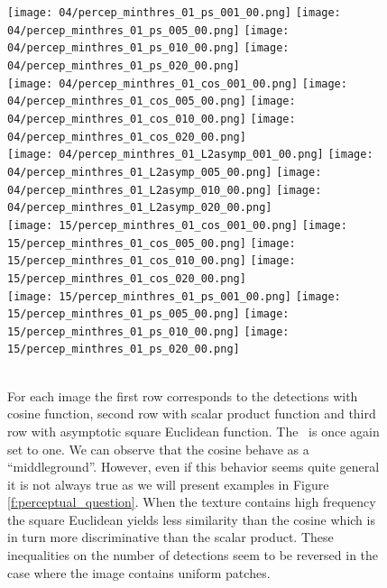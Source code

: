 \begin{figure}[H]
  \centering
  {\texttt{[image: 04/percep\_minthres\_01\_ps\_001\_00.png]}} \hfill
  {\texttt{[image: 04/percep\_minthres\_01\_ps\_005\_00.png]}} \hfill
  {\texttt{[image: 04/percep\_minthres\_01\_ps\_010\_00.png]}} \hfill  
  {\texttt{[image: 04/percep\_minthres\_01\_ps\_020\_00.png]}} \hfill \\
  {\texttt{[image: 04/percep\_minthres\_01\_cos\_001\_00.png]}} \hfill
  {\texttt{[image: 04/percep\_minthres\_01\_cos\_005\_00.png]}} \hfill
  {\texttt{[image: 04/percep\_minthres\_01\_cos\_010\_00.png]}} \hfill  
  {\texttt{[image: 04/percep\_minthres\_01\_cos\_020\_00.png]}} \hfill \\  
  {\texttt{[image: 04/percep\_minthres\_01\_L2asymp\_001\_00.png]}} \hfill
  {\texttt{[image: 04/percep\_minthres\_01\_L2asymp\_005\_00.png]}} \hfill
  {\texttt{[image: 04/percep\_minthres\_01\_L2asymp\_010\_00.png]}} \hfill  
  {\texttt{[image: 04/percep\_minthres\_01\_L2asymp\_020\_00.png]}} \hfill \\
  {\texttt{[image: 15/percep\_minthres\_01\_cos\_001\_00.png]}} \hfill
  {\texttt{[image: 15/percep\_minthres\_01\_cos\_005\_00.png]}} \hfill
  {\texttt{[image: 15/percep\_minthres\_01\_cos\_010\_00.png]}} \hfill  
  {\texttt{[image: 15/percep\_minthres\_01\_cos\_020\_00.png]}} \hfill \\
  {\texttt{[image: 15/percep\_minthres\_01\_ps\_001\_00.png]}} \hfill
  {\texttt{[image: 15/percep\_minthres\_01\_ps\_005\_00.png]}} \hfill
  {\texttt{[image: 15/percep\_minthres\_01\_ps\_010\_00.png]}} \hfill  
  {\texttt{[image: 15/percep\_minthres\_01\_ps\_020\_00.png]}} \hfill \\  
   \hfill
   \hfill
   \hfill  
   \hfill \\
  \caption{For each image the first row corresponds to the detections with cosine function, second row with scalar product function and third row with asymptotic square Euclidean function. The \NFA \ is once again set to one. We can observe that the cosine behave as a ``middleground''. However, even if this behavior seems quite general it is not always true as we will present examples in Figure \ref{f:perceptual_question}. When the texture contains high frequency the square Euclidean yields less similarity than the cosine which is in turn more discriminative than the scalar product. These inequalities on the number of detections seem to be reversed in the case where the image contains uniform patches.}
  \label{f:robustness_detection}
\end{figure}

